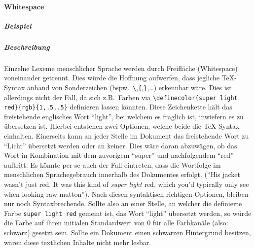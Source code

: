 \paragraph*{Whitespace}%
\subparagraph*{Beispiel}
\subparagraph*{Beschreibung}
Einzelne Lexeme menschlicher Sprache werden durch Freifläche (Whitespace) voneinander getrennt. Dies würde die Hoffnung aufwerfen, dass jegliche \TeX{}-Syntax anhand von Sonderzeichen (bspw.\ \verb|\|,\verb|{|,\verb|}|,\ldots) erkennbar wäre. Dies ist allerdings nicht der Fall, da sich z.B.\ Farben via \verb|\definecolor{super light red}{rgb}{1,.5,.5}| definieren lassen könnten. Diese Zeichenkette hält das freistehende englisches Wort \enquote{light}, bei welchem es fraglich ist, inwiefern es zu übersetzen ist. Hierbei entstehen zwei Optionen, welche beide die \TeX{}-Syntax einhalten. Einerseits kann an jeder Stelle im Dokument das freistehende Wort zu \enquote{Licht} übersetzt werden oder an keiner. Dies wäre daran abzuwägen, ob das Wort in Kombination mit dem zuvorigem \enquote{super} und nachfolgendem \enquote{red} auftritt. Es könnte per se auch der Fall eintreten, dass die Wortfolge im menschlichen Sprachegebrauch innerhalb des Dokumentes erfolgt. (\enquote{His jacket wasn't just red. It was this kind of \textit{super light} red, which you'd typically only see when looking raw mutton}). Nach diesen syntaktisch richtigen Optionen, bleiben nur noch Syntaxbrechende. Sollte also an einer Stelle, an welcher die definierte Farbe \texttt{super light red} gemeint ist, das Wort \enquote{light} übersetzt werden, so würde die Farbe auf ihren initialen Standardwert von $0$ für alle Farbkanäle (also: schwarz) gesetzt sein. Sollte ein Dokument einen schwarzen Hintergrund besitzen, wären diese textlichen Inhalte nicht mehr lesbar.\\\noindent


